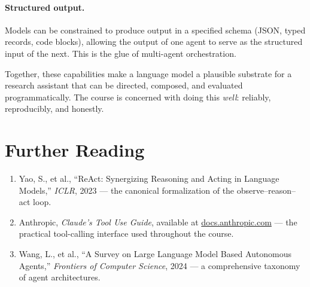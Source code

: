 \paragraph{Structured output.}
Models can be constrained to produce output in a specified schema (JSON, typed records, code blocks), allowing the output of one agent to serve as the structured input of the next.
This is the glue of multi-agent orchestration.

Together, these capabilities make a language model a plausible substrate for a research assistant that can be directed, composed, and evaluated programmatically.
The course is concerned with doing this \emph{well}: reliably, reproducibly, and honestly.

\section*{Further Reading}

\begin{small}
\begin{enumerate}
\item Yao, S., et al., ``ReAct: Synergizing Reasoning and Acting in Language Models,'' \emph{ICLR}, 2023 — the canonical formalization of the observe–reason–act loop.
\item Anthropic, \emph{Claude's Tool Use Guide}, available at \href{https://docs.anthropic.com}{docs.anthropic.com} — the practical tool-calling interface used throughout the course.
\item Wang, L., et al., ``A Survey on Large Language Model Based Autonomous Agents,'' \emph{Frontiers of Computer Science}, 2024 — a comprehensive taxonomy of agent architectures.
\end{enumerate}
\end{small}
